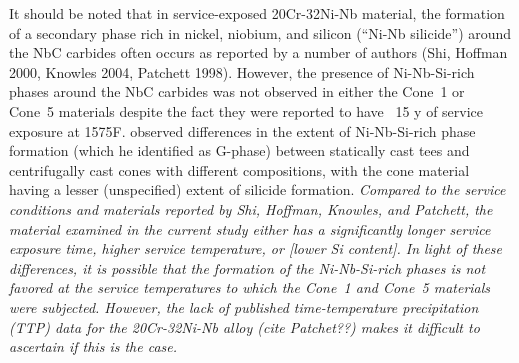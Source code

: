 It should be noted that in service-exposed 20Cr-32Ni-Nb material, the formation of a secondary phase rich in nickel, niobium, and silicon (``Ni-Nb silicide'') around the NbC carbides often occurs as reported by a number of authors (Shi, Hoffman 2000, Knowles 2004, Patchett 1998). However, the presence of Ni-Nb-Si-rich phases around the NbC carbides was not observed in either the Cone~1 or Cone~5 materials despite the fact they were reported to have ~15 y of service exposure at 1575\textdegree{}F. \citet{hoffman_high_2000-1} observed differences in the extent of Ni-Nb-Si-rich phase formation (which he identified as G-phase) between statically cast tees and centrifugally cast cones with different compositions, with the cone material having a lesser (unspecified) extent of silicide formation. \emph{Compared to the service conditions and materials reported by Shi, Hoffman, Knowles, and Patchett, the material examined in the current study either has a significantly longer service exposure time, higher service temperature, or [lower Si content]. In light of these differences, it is possible that the formation of the Ni-Nb-Si-rich phases is not favored at the service temperatures to which the Cone~1 and Cone~5 materials were subjected. However, the lack of published time-temperature precipitation (TTP) data for the 20Cr-32Ni-Nb alloy (cite Patchet??) makes it difficult to ascertain if this is the case.}




